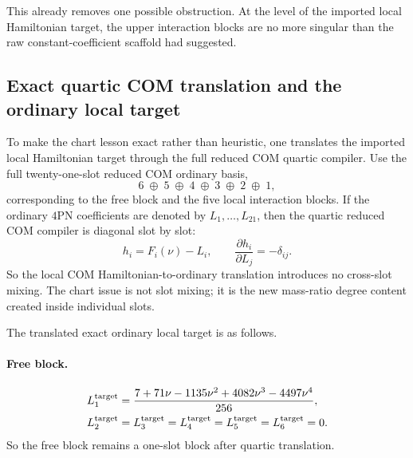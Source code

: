 \documentclass[11pt]{article}
\begin{document}
This already removes one possible obstruction.  At the level of the imported
local Hamiltonian target, the upper interaction blocks are no more singular than
the raw constant-coefficient scaffold had suggested.

\subsection{Exact quartic COM translation and the ordinary local target}
\label{app:imported-local-target-ordinary-translation}

To make the chart lesson exact rather than heuristic, one translates the
imported local Hamiltonian target through the full reduced COM quartic compiler.
Use the full twenty-one-slot reduced COM ordinary basis,
\begin{equation}
6\;\oplus\;5\;\oplus\;4\;\oplus\;3\;\oplus\;2\;\oplus\;1,
\label{eq:app-local-target-ordinary-basis-structure}
\end{equation}
corresponding to the free block and the five local interaction blocks.  If the
ordinary \(4\)PN coefficients are denoted by \(L_1,\dots,L_{21}\), then the
quartic reduced COM compiler is diagonal slot by slot:
\begin{equation}
h_i=F_i(\nu)-L_i,
\qquad
\frac{\partial h_i}{\partial L_j}=-\delta_{ij}.
\label{eq:app-local-target-diagonal-com-map}
\end{equation}
So the local COM Hamiltonian-to-ordinary translation introduces no cross-slot
mixing.  The chart issue is not slot mixing; it is the new mass-ratio degree
content created inside individual slots.

The translated exact ordinary local target is as follows.

\paragraph{Free block.}
\begin{equation}
\begin{aligned}
L_1^{\rm target}
&=
\frac{7+71\nu-1135\nu^2+4082\nu^3-4497\nu^4}{256},
\\
L_2^{\rm target}&=L_3^{\rm target}=L_4^{\rm target}=L_5^{\rm target}=L_6^{\rm target}=0.
\end{aligned}
\label{eq:app-local-target-ordinary-free}
\end{equation}
So the free block remains a one-slot block after quartic translation.
\end{document}
